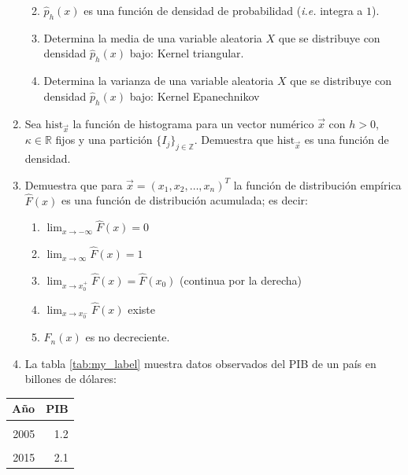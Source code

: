 \documentclass[
]{book}
\providecommand{\tightlist}{%
  \setlength{\itemsep}{0pt}\setlength{\parskip}{0pt}}
\begin{document}
\begin{enumerate}
  \begin{enumerate}
  \def\labelenumii{\alph{enumii}.}
  \tightlist
  \item
    \(\hat{p}_h(x)\) es una función de densidad de probabilidad (\textit{i.e.} integra a \(1\)).
  \item
    Determina la media de una variable aleatoria \(X\) que se distribuye con densidad \(\hat{p}_h(x)\) bajo: Kernel triangular.
  \item
    Determina la varianza de una variable aleatoria \(X\) que se distribuye con densidad \(\hat{p}_h(x)\) bajo: Kernel Epanechnikov
  \end{enumerate}
\item
  Sea \(\text{hist}_{\vec{x}}\) la función de histograma para un vector numérico \(\vec{x}\) con \(h > 0\), \(\kappa \in \mathbb{R}\) fijos y una partición \(\{I_j\}_{j \in \mathbb{Z}}\). Demuestra que \(\text{hist}_{\vec{x}}\) es una función de densidad.
\item
  Demuestra que para \(\vec{x} = (x_1, x_2, \dots, x_n)^T\) la función de distribución empírica \(\hat{F}(x)\) es una función de distribución acumulada; es decir:

  \begin{enumerate}
  \def\labelenumii{\alph{enumii}.}
  \tightlist
  \item
    \(\lim_{x \to -\infty} \hat{F} (x) = 0\)
  \item
    \(\lim_{x \to \infty} \hat{F} (x) = 1\)
  \item
    \(\lim_{x \to x_0^+} \hat{F} (x) = \hat{F} (x_0)\) (continua por la derecha)
  \item
    \(\lim_{x \to x_0^-} \hat{F} (x)\) existe
  \item
    \(F_n (x)\) es no decreciente.
  \end{enumerate}
\item
  La tabla \ref{tab:my_label} muestra datos observados del PIB de un país en billones de dólares:
\end{enumerate}

\begin{table}
\centering
\begin{tabular}{r|r}
\hline
Año & PIB\\
\hline
\cellcolor{gray!6}{2000} & \cellcolor{gray!6}{0.5}\\
\hline
2005 & 1.2\\
\hline
\cellcolor{gray!6}{2010} & \cellcolor{gray!6}{1.5}\\
\hline
2015 & 2.1\\
\hline
\end{tabular}
\end{table}
\end{document}
